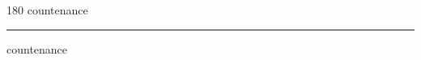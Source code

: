 
\begin{frame}
\begin{center}
\begin{turn}{180}
{\fontsize{2.5cm}{1em}\selectfont countenance}
\end{turn}
\vspace{1em}\par  
\hrule
\vspace{1em}\par  
{\fontsize{2.5cm}{1em}\selectfont countenance}
\end{center}
\end{frame}
